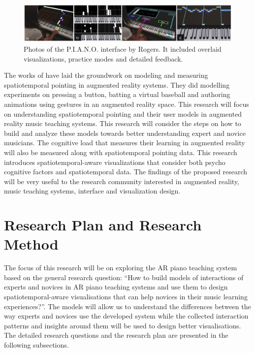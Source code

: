 \documentclass[manuscript,screen]{acmart}
\begin{document}
\begin{figure}[h]
\centering
 \includegraphics[width=12cm]{figures/pianoUBC.png}
    \caption{Photos of the P.I.A.N.O. interface by Rogers. It included overlaid visualizations, practice modes and detailed feedback. 
    }\label{fig:ubicomp}
\end{figure}
The works of  have laid the groundwork on modeling and measuring spatiotemporal pointing in augmented reality systems. They did modelling experiments on pressing a button, batting a virtual baseball and authoring animations using gestures in an augmented reality space. This research will focus on understanding spatiotemporal pointing and their user models in augmented reality music teaching systems. This research will consider the steps on how to build and analyze these models towards better understanding expert and novice musicians. The cognitive load that measures their learning in augmented reality will also be measured along with spatiotemporal pointing data. This research introduces spatiotemporal-aware visualizations that consider both psycho cognitive factors and spatiotemporal data. The findings of the proposed research will be very useful to the research community interested in augmented reality, music teaching systems, interface  and visualization design.

\section{Research Plan and Research Method}
The focus of this research will be on exploring the AR piano teaching system based on the general research question: “How to  build models of interactions of experts and novices in AR piano teaching systems and use them to design spatiotemporal-aware visualisations that can help novices in their music learning experiences?”. The models will allow us to understand the differences between the way experts and novices use the developed system while the collected interaction patterns and insights around them will be used to design better visualisations. The detailed research questions and the research plan are presented in the following subsections. 
\end{document}
